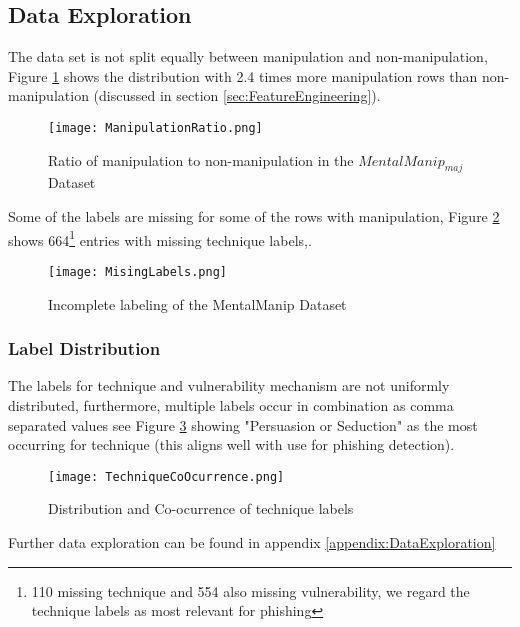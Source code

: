 \documentclass[
	letterpaper, %
	12pt, %
	unnumberedsections, %
	twoside, %
]{LTJournalArticle}
\begin{document}
\subsection{Data Exploration}\label{sec:DataExploration}
The data set is not split equally between manipulation and non-manipulation, Figure \ref{fig:ManipulationRatio} shows the distribution with 2.4 times more manipulation rows than non-manipulation (discussed in section \ref{sec:FeatureEngineering}).

\begin{figure}[!htp] %
	\centering
	\texttt{[image: ManipulationRatio.png]}
	\caption{Ratio of manipulation to non-manipulation in the $MentalManip_{maj}$ Dataset}
	\label{fig:ManipulationRatio}
\end{figure}

Some of the labels are missing for some of the rows with manipulation, Figure \ref{fig:MissingLabels} shows 664\footnote{110 missing technique and 554 also missing vulnerability, we regard the technique labels as most relevant for phishing} entries with missing technique labels,.
\begin{figure}[!htp] %
	\centering
	\texttt{[image: MisingLabels.png]}
	\caption{Incomplete labeling of the MentalManip Dataset}
	\label{fig:MissingLabels}
\end{figure}

\subsubsection{Label Distribution}
The labels for technique and vulnerability mechanism are not uniformly distributed, furthermore, multiple labels occur in combination as comma separated values see Figure \ref{fig:TechCoOcurrence} showing "Persuasion or Seduction" as the most occurring for technique (this aligns well with use for phishing detection).

\begin{figure}[!htp] %
	\centering
	\texttt{[image: TechniqueCoOcurrence.png]}
	\caption{Distribution and Co-ocurrence of technique labels}
	\label{fig:TechCoOcurrence}
\end{figure}

Further data exploration can be found in appendix \ref{appendix:DataExploration}
\end{document}
